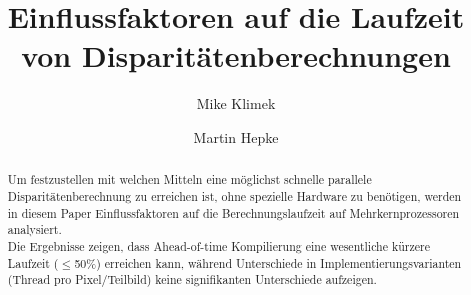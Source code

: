 \documentclass[%
  a4paper,%
  12pt,%
  style=screen, %
  oneside,
  blue,%
  ]{tubsartcl}
\begin{document}
\title{Einflussfaktoren auf die Laufzeit von Disparitätenberechnungen}
\author{Mike Klimek \and Martin Hepke}
\maketitle%

\begin{abstract}
\noindent Um festzustellen mit welchen Mitteln eine möglichst schnelle parallele Disparitätenberechnung zu erreichen
ist, ohne spezielle Hardware zu benötigen, werden in diesem Paper Einflussfaktoren auf die Berechnungslaufzeit auf
Mehrkernprozessoren analysiert. \\
Die Ergebnisse zeigen, dass Ahead-of-time Kompilierung eine wesentliche kürzere Laufzeit ($\leq$50\%) erreichen kann,
während Unterschiede in Implementierungs\-varianten (Thread pro Pixel/Teilbild) keine signifikanten Unterschiede
aufzeigen. 
\end{abstract}
\end{document}
